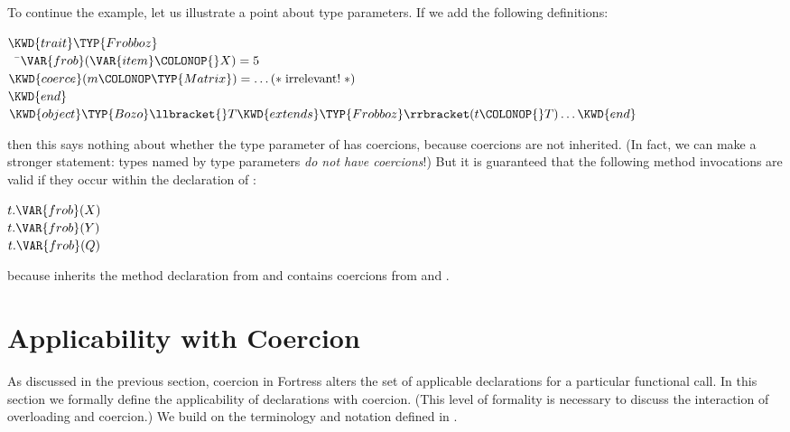 To continue the example, let us illustrate a point about type parameters.
If we add the following definitions:
%
\begin{Fortress}
\(\KWD{trait} \TYP{Frobboz}\)\\
{\tt~~}\pushtabs\=\+\(  \VAR{frob}(\VAR{item}\COLONOP{}X) = 5\)\\
\(  \KWD{coerce}(m\COLONOP\TYP{Matrix}) = \ldots  \mathtt{(*}\;\hbox{\rm  irrelevant! \unskip}\;\mathtt{*)}\)\-\\\poptabs
\(\KWD{end}\)\\[4pt]
\(\KWD{object} \TYP{Bozo}\llbracket{}T \KWD{extends} \TYP{Frobboz}\rrbracket(t\COLONOP{}T)  \ldots \KWD{end}\)
\end{Fortress}
then this says nothing about whether the type parameter  of 
has coercions, because coercions are not inherited.  (In fact, we can
make a stronger statement: types named by type parameters \emph{do not have coercions}!)
But it is guaranteed that the following method invocations are valid
if they occur within the declaration of :
\begin{Fortress}
\(t.\VAR{frob}(X)\)\\
\(t.\VAR{frob}(Y)\)\\
\(t.\VAR{frob}(Q)\)
\end{Fortress}
because  inherits the method declaration
from  and  contains coercions from  and .



\section{Applicability with Coercion}

As discussed in the previous section, coercion in Fortress alters the
set of applicable declarations for a particular functional call.  In
this section we formally define the applicability of declarations with
coercion.  (This level of formality is necessary to discuss the
interaction of overloading and coercion.)
We build on the terminology and notation defined in
.

